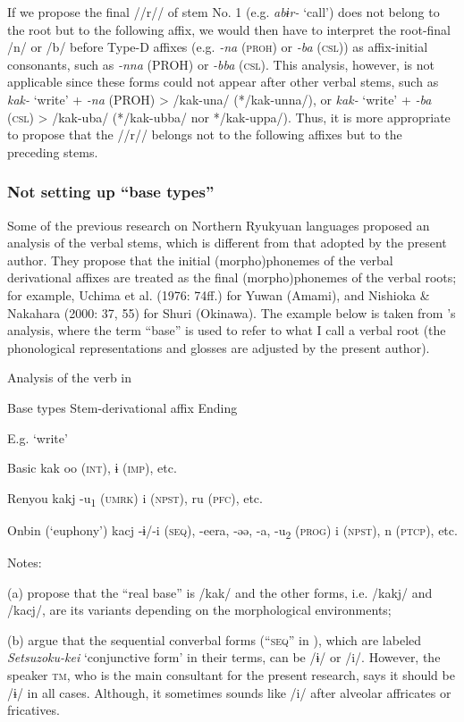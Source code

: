 If we propose the final //r// of stem No. 1 (e.g. \textit{abɨr-} ‘call’) does not belong to the root but to the following affix, we would then have to interpret the root-final /n/ or /b/ before Type-D affixes (e.g. \textit{-na} (\textsc{proh}) or \textit{-ba} (\textsc{csl})) as affix-initial consonants, such as \textit{-nna} (PROH) or \textit{-bba} (\textsc{csl}). This analysis, however, is not applicable since these forms could not appear after other verbal stems, such as \textit{kak-} ‘write’ + \textit{-na} (PROH) > /kak-una/ (*/kak-unna/), or \textit{kak-} ‘write’ + \textit{-ba} (\textsc{csl}) > /kak-uba/ (*/kak-ubba/ nor */kak-uppa/). Thus, it is more appropriate to propose that the //r// belongs not to the following affixes but to the preceding stems.

\subsubsection{Not setting up “base types”}

Some of the previous research on Northern Ryukyuan languages proposed an analysis of the verbal stems, which is different from that adopted by the present author. They propose that the initial (morpho)phonemes of the verbal derivational affixes are treated as the final (morpho)phonemes of the verbal roots; for example, Uchima et al. (1976: 74ff.) for Yuwan (Amami), and Nishioka \& Nakahara (2000: 37, 55) for Shuri (Okinawa). The example below is taken from \citet{UchimaEtAl1976}’s analysis, where the term “base” is used to refer to what I call a verbal root (the phonological representations and glosses are adjusted by the present author).

\begin{table}
\caption{\label{tab:key:68}Analysis of the verb in \citet{UchimaEtAl1976}}

Base types    Stem-derivational affix  Ending

  E.g. ‘write’

Basic  kak    oo (\textsc{int}), ɨ (\textsc{imp}), etc.

Renyou  kakj  -u\textsubscript{1} (\textsc{umrk})  i (\textsc{npst}), ru (\textsc{pfc}), etc.

Onbin (‘euphony’)  kacj  -ɨ/-i (\textsc{seq}), -eera, -əə, -a, -u\textsubscript{2} (\textsc{prog})  i (\textsc{npst}), n (\textsc{ptcp}), etc.

Notes:

(a) \citet[78]{UchimaEtAl1976} propose that the “real base” is /kak/ and the other forms, i.e. /kakj/ and /kacj/, are its variants depending on the morphological environments;

(b) \citet[91-92]{UchimaEtAl1976} argue that the sequential converbal forms (“\textsc{seq}” in ), which are labeled \textit{Setsuzoku-kei} ‘conjunctive form’ in their terms, can be /ɨ/ or /i/. However, the speaker \textsc{tm}, who is the main consultant for the present research, says it should be /ɨ/ in all cases. Although, it sometimes sounds like /i/ after alveolar affricates or fricatives.
\end{table}


